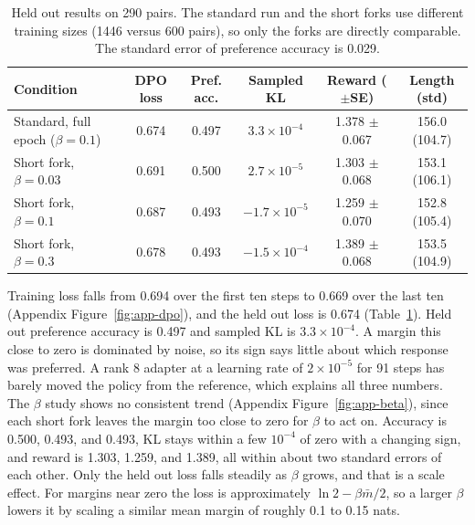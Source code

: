 \documentclass{article}
\begin{document}
\begin{table}[!htb]
  \centering
  \small
  \begin{tabular}{lccccc}
    \toprule
    Condition & DPO loss & Pref. acc. & Sampled KL & Reward ($\pm$SE) & Length (std) \\
    \midrule
    Standard, full epoch ($\beta=0.1$) & 0.674 & 0.497 & $3.3\times10^{-4}$ & 1.378 $\pm$ 0.067 & 156.0 (104.7) \\
    Short fork, $\beta=0.03$           & 0.691 & 0.500 & $2.7\times10^{-5}$ & 1.303 $\pm$ 0.068 & 153.1 (106.1) \\
    Short fork, $\beta=0.1$            & 0.687 & 0.493 & $-1.7\times10^{-5}$ & 1.259 $\pm$ 0.070 & 152.8 (105.4) \\
    Short fork, $\beta=0.3$            & 0.678 & 0.493 & $-1.5\times10^{-4}$ & 1.389 $\pm$ 0.068 & 153.5 (104.9) \\
    \bottomrule
  \end{tabular}
  \vspace{8pt}
  \caption{Held out results on 290 pairs. The standard run and the short forks
  use different training sizes (1446 versus 600 pairs), so only the forks are directly
  comparable. The standard error of preference accuracy is 0.029.}
  \label{tab:task1-main}
\end{table}

Training loss falls from 0.694 over the first ten steps to 0.669 over the last
ten (Appendix Figure~\ref{fig:app-dpo}), and the held out loss is 0.674 (Table~\ref{tab:task1-main}). Held out
preference accuracy is 0.497 and sampled KL is $3.3\times10^{-4}$. A margin this
close to zero is dominated by noise, so its sign says little about which response
was preferred. A rank 8 adapter at a learning rate of $2\times10^{-5}$ for 91
steps has barely moved the policy from the reference, which explains all three
numbers. The $\beta$ study
shows no consistent trend (Appendix Figure~\ref{fig:app-beta}), since each short
fork leaves the margin too close to zero for $\beta$ to act on. Accuracy is 0.500, 0.493, and 0.493, KL stays
within a few $10^{-4}$ of zero with a changing sign, and reward is 1.303, 1.259,
and 1.389, all within about two standard errors of each other. Only the held out
loss falls steadily as $\beta$ grows, and that is a scale effect. For margins near zero the
loss is approximately $\ln 2-\beta\bar m/2$, so a larger $\beta$ lowers it by
scaling a similar mean margin of roughly 0.1 to 0.15 nats.
\end{document}
